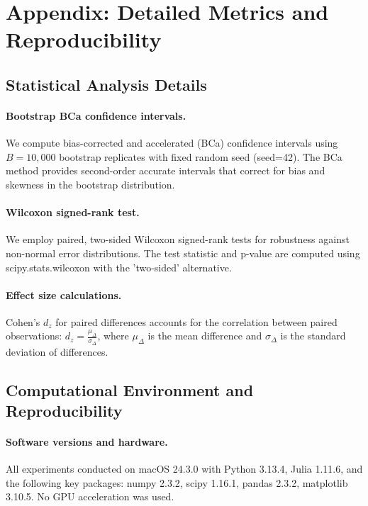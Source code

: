 \section{Appendix: Detailed Metrics and Reproducibility}

\subsection{Statistical Analysis Details}

\paragraph{Bootstrap BCa confidence intervals.} We compute bias-corrected and accelerated (BCa) confidence intervals using $B=10,000$ bootstrap replicates with fixed random seed (seed=42). The BCa method provides second-order accurate intervals that correct for bias and skewness in the bootstrap distribution. %

\paragraph{Wilcoxon signed-rank test.} We employ paired, two-sided Wilcoxon signed-rank tests for robustness against non-normal error distributions. The test statistic and p-value are computed using scipy.stats.wilcoxon with the 'two-sided' alternative. %

\paragraph{Effect size calculations.} Cohen's $d_z$ for paired differences accounts for the correlation between paired observations: $d_z = \frac{\mu_{\Delta}}{\sigma_{\Delta}}$, where $\mu_{\Delta}$ is the mean difference and $\sigma_{\Delta}$ is the standard deviation of differences. %

\subsection{Computational Environment and Reproducibility}

\paragraph{Software versions and hardware.} All experiments conducted on macOS 24.3.0 with Python 3.13.4, Julia 1.11.6, and the following key packages: numpy 2.3.2, scipy 1.16.1, pandas 2.3.2, matplotlib 3.10.5. No GPU acceleration was used. %

